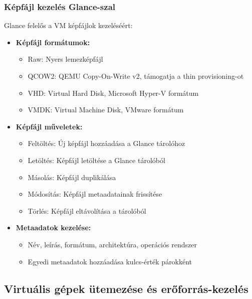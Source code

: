 \documentclass[a4paper,12pt]{article}
\begin{document}
    \subsubsection{Képfájl kezelés Glance-szal}

    Glance felelős a VM képfájlok kezeléséért:

    \begin{itemize}
        \item \textbf{Képfájl formátumok:}
        \begin{itemize}
            \item Raw: Nyers lemezképfájl
            \item QCOW2: QEMU Copy-On-Write v2, támogatja a thin provisioning-ot
            \item VHD: Virtual Hard Disk, Microsoft Hyper-V formátum
            \item VMDK: Virtual Machine Disk, VMware formátum
        \end{itemize}

        \item \textbf{Képfájl műveletek:}
        \begin{itemize}
            \item Feltöltés: Új képfájl hozzáadása a Glance tárolóhoz
            \item Letöltés: Képfájl letöltése a Glance tárolóból
            \item Másolás: Képfájl duplikálása
            \item Módosítás: Képfájl metaadatainak frissítése
            \item Törlés: Képfájl eltávolítása a tárolóból
        \end{itemize}

        \item \textbf{Metaadatok kezelése:}
        \begin{itemize}
            \item Név, leírás, formátum, architektúra, operációs rendszer
            \item Egyedi metaadatok hozzáadása kulcs-érték párokként
        \end{itemize}
    \end{itemize}

    \subsection{Virtuális gépek ütemezése és erőforrás-kezelés}
\end{document}
